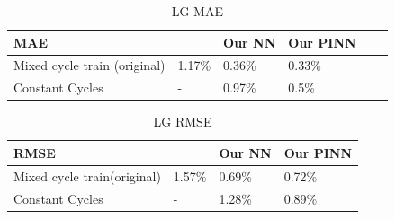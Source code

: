 \begin{table}[!ht]
    \centering
    \label{tab:lg-mae}
    \begin{tabular}{|l|l|l|l|l|l|}
    \hline
        MAE & \cite{wong-2021} & Our NN & Our PINN\\ \hline
        Mixed cycle train (original) & 1.17\% & 0.36\% & 0.33\% \\ \hline
        Constant Cycles & - & 0.97\% & 0.5\% \\ \hline
    \end{tabular}
    \caption{LG MAE}
\end{table}



\begin{table}[!ht]
    \centering
    \label{tab:lg-rmse}
    \begin{tabular}{|l|l|l|l|}
    \hline
        RMSE & \cite{wong-2021} & Our NN & Our PINN  \\ \hline
        Mixed cycle train(original) & 1.57\% & 0.69\% & 0.72\%  \\ \hline
        Constant Cycles & - & 1.28\% & 0.89\% \\ \hline
    \end{tabular}
    \caption{LG RMSE}
\end{table}